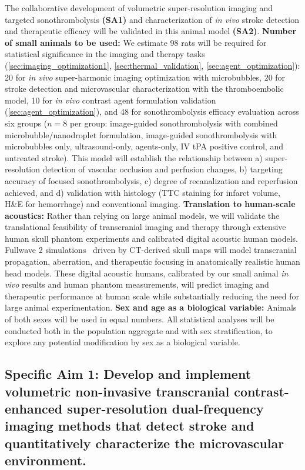 The collaborative development of volumetric super-resolution imaging and targeted sonothrombolysis \textbf{(SA1)} and characterization of \textit{in vivo} stroke detection and therapeutic efficacy will be validated in this animal model \textbf{(SA2)}.
\textbf{Number of small animals to be used:} We estimate 98 rats will be required for statistical significance in the imaging and therapy tasks (\ref{sec:imaging_optimization1}, \ref{sec:thermal_validation}, \ref{sec:agent_optimization}): 20 for \textit{in vivo} super-harmonic imaging optimization with microbubbles, 20 for stroke detection and microvascular characterization with the thromboembolic model, 10 for \textit{in vivo} contrast agent formulation validation (\ref{sec:agent_optimization}), and 48 for sonothrombolysis efficacy evaluation across six groups ($n=8$ per group: image-guided sonothrombolysis with combined microbubble/nanodroplet formulation, image-guided sonothrombolysis with microbubbles only, ultrasound-only, agents-only, IV tPA positive control, and untreated stroke). This model will establish the relationship between a) super-resolution detection of vascular occlusion and perfusion changes, b) targeting accuracy of focused sonothrombolysis, c) degree of recanalization and reperfusion achieved, and d) validation with histology (TTC staining for infarct volume, H\&E for hemorrhage) and conventional imaging.
\textbf{Translation to human-scale acoustics:} Rather than relying on large animal models, we will validate the translational feasibility of transcranial imaging and therapy through extensive human skull phantom experiments and calibrated digital acoustic human models. Fullwave 2 simulations~\cite{pinton2009heterogeneous,pinton2021fullwave} driven by CT-derived skull maps will model transcranial propagation, aberration, and therapeutic focusing in anatomically realistic human head models. These digital acoustic humans, calibrated by our small animal \textit{in vivo} results and human phantom measurements, will predict imaging and therapeutic performance at human scale while substantially reducing the need for large animal experimentation.
\textbf{Sex and age as a biological variable:} Animals of both sexes will be used in equal numbers. All statistical analyses will be conducted both in the population aggregate and with sex stratification, to explore any potential modification by sex as a biological variable.


\subsection{Specific Aim 1: Develop and implement volumetric non-invasive transcranial contrast-enhanced super-resolution dual-frequency imaging methods that detect stroke and quantitatively characterize the microvascular environment.}


